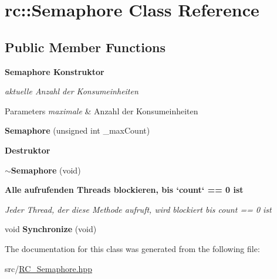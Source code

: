 \hypertarget{classrc_1_1Semaphore}{\section{rc\+:\+:Semaphore Class Reference}
\label{classrc_1_1Semaphore}
}
\subsection*{Public Member Functions}
\begin{Indent}{\bf Semaphore Konstruktor}\par
{\em aktuelle Anzahl der Konsumeinheiten


\begin{DoxyParams}{Parameters}
{\em maximale} & Anzahl der Konsumeinheiten \\
\hline
\end{DoxyParams}
}\begin{DoxyCompactItemize}
\item 
\hypertarget{classrc_1_1Semaphore_a6260f609fc0499bf67a7e5c77198f746}{{\bfseries Semaphore} (unsigned int \+\_\+max\+Count)}\label{classrc_1_1Semaphore_a6260f609fc0499bf67a7e5c77198f746}

\end{DoxyCompactItemize}
\end{Indent}
\begin{Indent}{\bf Destruktor}\par
\begin{DoxyCompactItemize}
\item 
\hypertarget{classrc_1_1Semaphore_ad7bb5c31cb578f9fb68983a23bd6a3e7}{{\bfseries $\sim$\+Semaphore} (void)}\label{classrc_1_1Semaphore_ad7bb5c31cb578f9fb68983a23bd6a3e7}

\end{DoxyCompactItemize}
\end{Indent}
\begin{Indent}{\bf Alle aufrufenden Threads blockieren, bis `count` == 0 ist}\par
{\em Jeder Thread, der diese Methode aufruft, wird blockiert bis {\ttfamily count} == 0 ist }\begin{DoxyCompactItemize}
\item 
\hypertarget{classrc_1_1Semaphore_a0fe2e6a5966af9b2e03dc5f8ffd64aff}{void {\bfseries Synchronize} (void)}\label{classrc_1_1Semaphore_a0fe2e6a5966af9b2e03dc5f8ffd64aff}

\end{DoxyCompactItemize}
\end{Indent}


The documentation for this class was generated from the following file\+:\begin{DoxyCompactItemize}
\item 
src/\hyperlink{RC__Semaphore_8hpp}{R\+C\+\_\+\+Semaphore.\+hpp}\end{DoxyCompactItemize}
